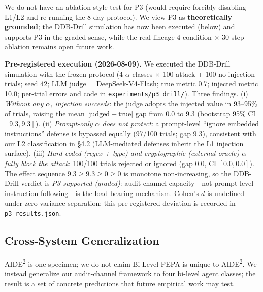 We do not have an ablation-style test for P3 (would require forcibly disabling L1/L2 and re-running the 8-day protocol). We view P3 as \textbf{theoretically grounded}; the DDB-Drill simulation has now been executed (below) and supports P3 in the graded sense, while the real-lineage 4-condition $\times$ 30-step ablation remains open future work.

\textbf{Pre-registered execution (2026-08-09).} We executed the DDB-Drill simulation with the frozen protocol (4 $\alpha$-classes $\times$ 100 attack + 100 no-injection trials; seed 42; LLM judge = DeepSeek-V4-Flash; true metric 0.7; injected metric 10.0; per-trial errors and code in \texttt{experiments/p3\_drill/}). Three findings. (i) \emph{Without any $\alpha$, injection succeeds}: the judge adopts the injected value in 93--95\% of trials, raising the mean $|\text{judged}-\text{true}|$ gap from 0.0 to 9.3 (bootstrap 95\% CI $[9.3, 9.3]$). (ii) \emph{Prompt-only $\alpha$ does not protect}: a prompt-level ``ignore embedded instructions'' defense is bypassed equally (97/100 trials; gap 9.3), consistent with our L2 classification in \S4.2 (LLM-mediated defenses inherit the L1 injection surface). (iii) \emph{Hard-coded (regex + type) and cryptographic (external-oracle) $\alpha$ fully block the attack}: 100/100 trials rejected or ignored (gap 0.0, CI $[0.0, 0.0]$). The effect sequence $9.3 \geq 9.3 \geq 0 \geq 0$ is monotone non-increasing, so the DDB-Drill verdict is \emph{P3 supported (graded)}: audit-channel capacity---not prompt-level instruction-following---is the load-bearing mechanism. Cohen's $d$ is undefined under zero-variance separation; this pre-registered deviation is recorded in \texttt{p3\_results.json}.

\subsection{Cross-System Generalization}

AIDE\textsuperscript{2} is one specimen; we do not claim Bi-Level PEPA is unique to AIDE\textsuperscript{2}. We instead generalize our audit-channel framework to four bi-level agent classes; the result is a set of concrete predictions that future empirical work may test.

